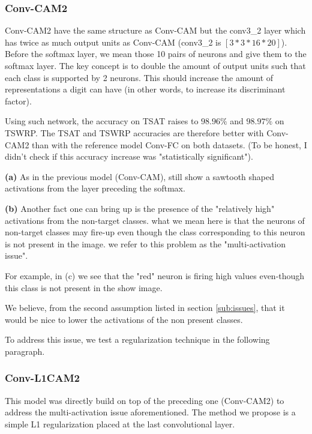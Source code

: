 			\subsubsection{Conv-CAM2}
			\label{ssub:conv_cam2}
				Conv-CAM2 have the same structure as Conv-CAM but the conv3\_2 layer which has twice as much output units as Conv-CAM (conv3\_2 is $[3*3*16*20]$). Before the softmax layer, we mean those 10 pairs of neurons and give them to the softmax layer. The key concept is to double the amount of output units such that each class is supported by 2 neurons. This should increase the amount of representations a digit can have (in other words, to increase its discriminant factor).

				Using such network, the accuracy on TSAT raises to $98.96\%$ and $98.97\%$ on TSWRP. The TSAT and TSWRP accuracies are therefore better with Conv-CAM2 than with the reference model Conv-FC on both datasets. (To be honest, I didn't check if this accuracy increase was "statistically significant").

				\begin{mdframed}[backgroundcolor = gray!30]
					\textbf{(a)} As in the previous model (Conv-CAM),  still show a sawtooth shaped activations from the layer preceding the softmax.

					\textbf{(b)} Another fact one can bring up is the presence of the "relatively high" activations from the non-target classes. what we mean here is that the neurons of non-target classes may fire-up even though the class corresponding to this neuron is not present in the image. we refer to this problem as the "multi-activation issue".

					For example, in  (c) we see that the "red" neuron is firing high values even-though this class is not present in the show image.

					We believe, from the second assumption listed in section \ref{sub:issues}, that it would be nice to lower the activations of the non present classes.

					To address this issue, we test a regularization technique in the following paragraph.
				\end{mdframed}
		

			
			\subsubsection{Conv-L1CAM2}
			\label{ssub:conv_l1cam}
				This model was directly build on top of the preceding one (Conv-CAM2) to address the multi-activation issue aforementioned. The method we propose is a simple L1 regularization placed at the last convolutional layer. 

